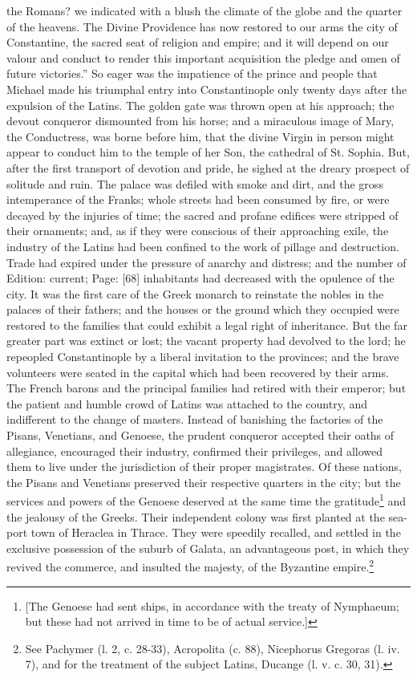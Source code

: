 the Romans? we indicated with a blush the climate of the globe and the quarter of the heavens. The Divine Providence has now restored to our arms the city of Constantine, the sacred seat of religion and empire; and it will depend on our valour and conduct to render this important acquisition the pledge and omen of future victories.\texthebrew{}” So eager was the impatience of the prince and people that Michael made his triumphal entry into Constantinople only twenty days after the expulsion of the Latins. The golden gate was thrown open at his approach; the devout conqueror dismounted from his horse; and a miraculous image of Mary, the Conductress, was borne before him, that the divine Virgin in person might appear to conduct him to the temple of her Son, the cathedral of St. Sophia. But, after the first transport of devotion and pride, he sighed at the dreary prospect of solitude and ruin. The palace was defiled with smoke and dirt, and the gross intemperance of the Franks; whole streets had been consumed by fire, or were decayed by the injuries of time; the sacred and profane edifices were stripped of their ornaments; and, as if they were conscious of their approaching exile, the industry of the Latins had been confined to the work of pillage and destruction. Trade had expired under the pressure of anarchy and distress; and the number of Edition: current; Page: [68] inhabitants had decreased with the opulence of the city. It was the first care of the Greek monarch to reinstate the nobles in the palaces of their fathers; and the houses or the ground which they occupied were restored to the families that could exhibit a legal right of inheritance. But the far greater part was extinct or lost; the vacant property had devolved to the lord; he repeopled Constantinople by a liberal invitation to the provinces; and the brave volunteers were seated in the capital which had been recovered by their arms. The French barons and the principal families had retired with their emperor; but the patient and humble crowd of Latins was attached to the country, and indifferent to the change of masters. Instead of banishing the factories of the Pisans, Venetians, and Genoese, the prudent conqueror accepted their oaths of allegiance, encouraged their industry, confirmed their privileges, and allowed them to live under the jurisdiction of their proper magistrates. Of these nations, the Pisans and Venetians preserved their respective quarters in the city; but the services and powers of the Genoese deserved at the same time the gratitude\footnote{[The Genoese had sent ships, in accordance with the treaty of Nymphaeum; but these had not arrived in time to be of actual service.]} and the jealousy of the Greeks. Their independent colony was first planted at the sea-port town of Heraclea in Thrace. They were speedily recalled, and settled in the exclusive possession of the suburb of Galata, an advantageous post, in which they revived the commerce, and insulted the majesty, of the Byzantine empire.\footnote{See Pachymer (l. 2, c. 28-33), Acropolita (c. 88), Nicephorus Gregoras (l. iv. 7), and for the treatment of the subject Latins, Ducange (l. v. c. 30, 31).}


